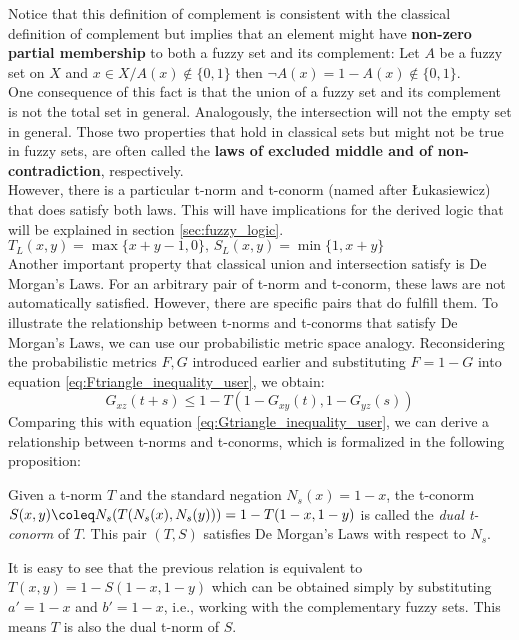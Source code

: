 Notice that this definition of complement is consistent with the classical definition of complement but implies that an element might have \textbf{non-zero partial membership} to both a fuzzy set and its complement: Let $A$ be a fuzzy set on $X$ and $x \in X / A(x)\notin \{0,1\}$ then $\lnot A(x)= 1 - A(x) \notin \{0,1\}$.\\
One consequence of this fact is that the union of a fuzzy set and its complement is not the total set in general. Analogously, the intersection will not the empty set in general. Those two properties that hold in classical sets but might not be true in fuzzy sets, are often called the \textbf{laws of excluded middle and of non-contradiction}, respectively.\\
However, there is a particular t-norm and t-conorm (named after \luka
Łukasiewicz) that does satisfy both laws. This will have implications for the derived logic that will be explained in section \ref{sec:fuzzy_logic}. 
\hspace{10em}$T_L(x,y)=\max\{x+y-1,0\},\, S_L(x,y)=\min\{1,x+y\}$\\
Another important property that classical union and intersection satisfy is De Morgan's Laws. For an arbitrary pair of t-norm and t-conorm, these laws are not automatically satisfied. However, there are specific pairs that do fulfill them. To illustrate the relationship between t-norms and t-conorms that satisfy De Morgan's Laws, we can use our probabilistic metric space analogy. Reconsidering the probabilistic metrics $F,G$ introduced earlier and substituting $F = 1 - G$ into equation \ref{eq:Ftriangle_inequality_user}, we obtain:
\[ G_{xz}(t + s) \leq 1 - T(1 - G_{xy}(t), 1 - G_{yz}(s))\]
Comparing this with equation \ref{eq:Gtriangle_inequality_user}, we can derive a relationship between t-norms and t-conorms, which is formalized in the following proposition:
\begin{proposition}
  Given a t-norm $T$ and the standard negation $N_s(x)=1-x$, the t-conorm $S(x,y)\coleq N_s(T(N_s(x), N_s(y))) = 1 - T(1-x, 1-y)$ is called the \emph{dual t-conorm} of $T$. This pair $(T,S)$ satisfies De Morgan's Laws with respect to $N_s$.
\end{proposition}
\begin{remark}
  It is easy to see that the previous relation is equivalent to $T(x,y) = 1-S(1-x, 1-y)$ which can be obtained simply by substituting $a'=1-x$ and $b'=1-x$, i.e., working with the complementary fuzzy sets. This means $T$ is also the dual t-norm of $S$.
\end{remark}
  
